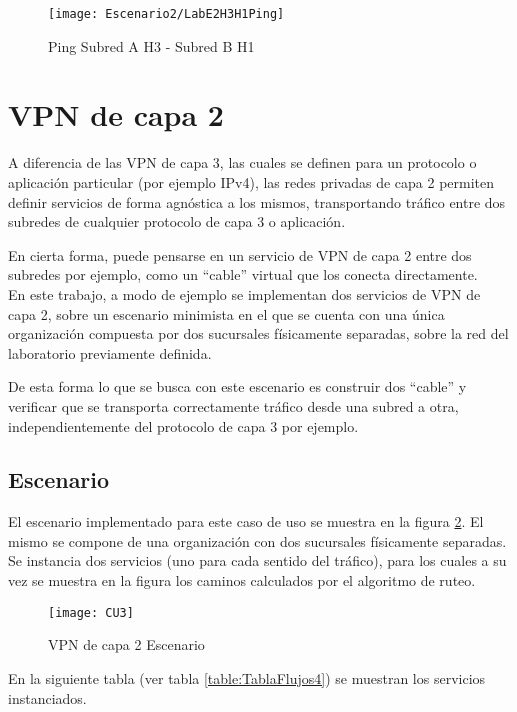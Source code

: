 \begin{figure}[h!] 
\centering    
\texttt{[image: Escenario2/LabE2H3H1Ping]}
\caption[Ping Subred A H3 - Subred B H1]{Ping Subred A H3 - Subred B H1}
\label{fig:CU1P1DumpFlows6}
\end{figure}


\section{VPN de capa 2}

A diferencia de las VPN de capa 3, las cuales se definen para un protocolo o aplicaci\'on particular  
 (por ejemplo IPv4), las redes privadas de capa 2 permiten definir servicios de forma agnóstica a los mismos, transportando tr\'afico entre dos subredes de cualquier protocolo de capa 3 o aplicación.

En cierta forma, puede pensarse en un servicio de VPN de capa 2 entre dos subredes por ejemplo, como un “cable” virtual que los conecta directamente.\\

En este trabajo, a modo de ejemplo se implementan dos servicios de VPN de capa 2, sobre un escenario minimista en el que se cuenta con una \'unica organización compuesta por dos sucursales físicamente separadas, sobre la red del laboratorio previamente definida.

De esta forma lo que se busca con este escenario es construir dos “cable” y verificar que se transporta correctamente tr\'afico desde una subred a otra, independientemente del protocolo de capa 3 por ejemplo.

\subsection{Escenario}
El escenario implementado para este caso de uso se muestra en la figura \ref{fig:CUP3}. El mismo se compone de una organización con dos sucursales físicamente separadas. Se instancia dos servicios (uno para cada sentido del tr\'afico), para los cuales a su vez se muestra en la figura los caminos calculados por el algoritmo de ruteo.

\newpage
\begin{figure}[h!] 
\centering    
\texttt{[image: CU3]}
\caption[VPN de capa 2 Escenario]{VPN de capa 2 Escenario}
\label{fig:CUP3}
\end{figure}

En la siguiente tabla (ver tabla \ref{table:TablaFlujos4}) se muestran los servicios instanciados.

